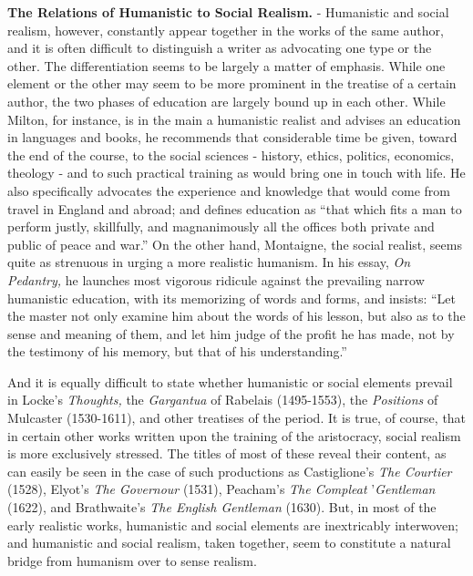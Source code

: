 \documentclass[]{book}
\begin{document}
\textbf{The Relations of Humanistic to Social Realism.} - Humanistic and social realism, however, constantly appear together in the works of the same author, and it is often difficult to distinguish a writer as advocating one type or the other. The differentiation seems to be largely a matter of emphasis. While one element or the other may seem to be more prominent in the treatise of a certain author, the two phases of education are largely bound up in each other. While Milton, for instance, is in the main a humanistic realist and advises an education in languages and books, he recommends that considerable time be given, toward the end of the course, to the social sciences - history, ethics, politics, economics, theology - and to such practical training as would bring one in touch with life. He also specifically advocates the experience and knowledge that would come from travel in England and abroad; and defines education as ``that which fits a man to perform justly, skillfully, and magnanimously all the offices both private and public of peace and war.'' On the other hand, Montaigne, the social realist, seems quite as strenuous in urging a more realistic humanism. In his essay, \emph{On Pedantry,} he launches most vigorous ridicule against the prevailing narrow humanistic education, with its memorizing of words and forms, and insists: ``Let the master not only examine him about the words of his lesson, but also as to the sense and meaning of them, and let him judge of the profit he has made, not by the testimony of his memory, but that of his understanding.''

And it is equally difficult to state whether humanistic or social elements prevail in Locke's \emph{Thoughts,} the \emph{Gargantua} of Rabelais (1495-1553), the \emph{Positions} of Mulcaster (1530-1611), and other treatises of the period. It is true, of course, that in certain other works written upon the training of the aristocracy, social realism is more exclusively stressed. The titles of most of these reveal their content, as can easily be seen in the case of such productions as Castiglione's \emph{The Courtier} (1528), Elyot's \emph{The Governour} (1531), Peacham's \emph{The Compleat} '\emph{Gentleman} (1622), and Brathwaite's \emph{The English Gentleman} (1630). But, in most of the early realistic works, humanistic and social elements are inextricably interwoven; and humanistic and social realism, taken together, seem to constitute a natural bridge from humanism over to sense realism.
\end{document}
